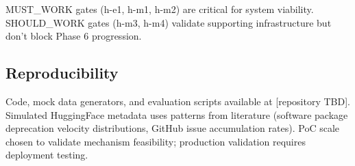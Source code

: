 MUST\_WORK gates (h-e1, h-m1, h-m2) are critical for system viability. SHOULD\_WORK gates (h-m3, h-m4) validate supporting infrastructure but don't block Phase 6 progression.

\subsection{Reproducibility}

Code, mock data generators, and evaluation scripts available at [repository TBD]. Simulated HuggingFace metadata uses patterns from literature (software package deprecation velocity distributions, GitHub issue accumulation rates). PoC scale chosen to validate mechanism feasibility; production validation requires deployment testing.

